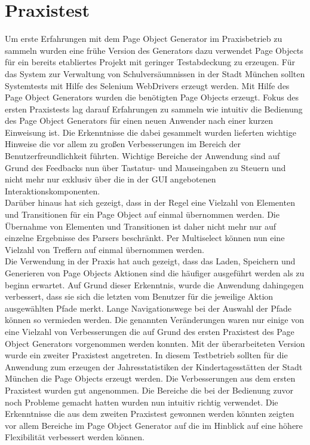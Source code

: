\section{Praxistest}
Um erste Erfahrungen mit dem Page Object Generator im Praxisbetrieb zu sammeln wurden eine frühe Version des Generators dazu verwendet Page Objects für ein bereits etabliertes Projekt mit geringer Testabdeckung zu erzeugen.
Für das System zur Verwaltung von Schulversäumnissen in der Stadt München sollten Systemtests mit Hilfe des Selenium WebDrivers erzeugt werden. Mit Hilfe des Page Object Generators wurden die benötigten Page Objects erzeugt.
Fokus des ersten Praxistests lag darauf Erfahrungen zu sammeln wie intuitiv die Bedienung des Page Object Generators für einen neuen Anwender nach einer kurzen Einweisung ist.
Die Erkenntnisse die dabei gesammelt wurden lieferten wichtige Hinweise die vor allem zu großen Verbesserungen im Bereich der Benutzerfreundlichkeit führten.
Wichtige Bereiche der Anwendung sind auf Grund des Feedbacks nun über Tastatur- und Mauseingaben zu Steuern und nicht mehr nur exklusiv über die in der GUI angebotenen Interaktionskomponenten. \\ Darüber hinaus hat sich gezeigt, dass in der Regel eine Vielzahl von Elementen und Transitionen für ein Page Object auf einmal übernommen werden. Die Übernahme von Elementen und Transitionen ist daher nicht mehr nur auf einzelne Ergebnisse des Parsers beschränkt. Per Multiselect können nun eine Vielzahl von Treffern auf einmal übernommen werden.\\ Die Verwendung in der Praxis hat auch gezeigt, dass das Laden, Speichern und Generieren von Page Objects Aktionen sind die häufiger ausgeführt werden als zu beginn erwartet. Auf Grund dieser Erkenntnis, wurde die Anwendung dahingegen verbessert, dass sie sich die letzten vom Benutzer für die jeweilige Aktion ausgewählten Pfade merkt. Lange Navigationswege bei der Auswahl der Pfade können so vermieden werden. Die genannten Veränderungen waren nur einige von eine Vielzahl von Verbesserungen die auf Grund des ersten Praxistest des Page Object Generators vorgenommen werden konnten.
Mit der überarbeiteten Version wurde ein zweiter Praxistest angetreten. In diesem Testbetrieb sollten für die Anwendung zum erzeugen der Jahresstatistiken der Kindertagesstätten der Stadt München die Page Objects erzeugt werden.
Die Verbesserungen aus dem ersten Praxistest wurden gut angenommen. Die Bereiche die bei der Bedienung zuvor noch Probleme gemacht hatten wurden nun intuitiv richtig verwendet.
Die Erkenntnisse die aus dem zweiten Praxistest gewonnen werden könnten zeigten vor allem Bereiche im Page Object Generator auf die im Hinblick auf eine höhere Flexibilität verbessert werden können.
